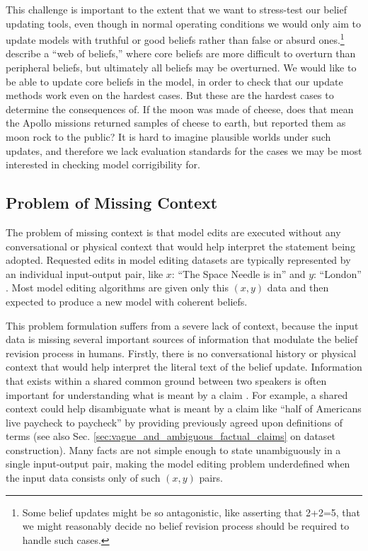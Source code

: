 \documentclass[11pt,a4paper]{article}
\begin{document}
This challenge is important to the extent that we want to stress-test our belief updating tools, even though in normal operating conditions we would only aim to update models with truthful or good beliefs rather than false or absurd ones.\footnote{Some belief updates might be so antagonistic, like asserting that 2+2=5, that we might reasonably decide no belief revision process should be required to handle such cases.} \citet{quine1970web} describe a ``web of beliefs,'' where core beliefs are more difficult to overturn than peripheral beliefs, but ultimately all beliefs may be overturned. 
We would like to be able to update core beliefs in the model, in order to check that our update methods work even on the hardest cases. But these are the hardest cases to determine the consequences of. If the moon was made of cheese, does that mean the Apollo missions returned samples of cheese to earth, but reported them as moon rock to the public? It is hard to imagine plausible worlds under such updates, and therefore we lack evaluation standards for the cases we may be most interested in checking model corrigibility for. 

\subsection{Problem of Missing Context}
\label{sec:problem_of_decontextualization}
The problem of missing context is that model edits are executed without any conversational or physical context that would help interpret the statement being adopted. Requested edits in model editing datasets are typically represented by an individual input-output pair, like $x$: ``The Space Needle is in'' and $y$: ``London'' \citep{zhu2020modifying, de2021editing, hase2021language, meng2022locating}. Most model editing algorithms are given only this $(x,y)$ data and then expected to produce a new model with coherent beliefs. 

This problem formulation suffers from a severe lack of context, because the input data is missing several important sources of information that modulate the belief revision process in humans. Firstly, there is no conversational history or physical context that would help interpret the literal text of the belief update. Information that exists within a shared common ground between two speakers is often important for understanding what is meant by a claim \citep{sep-speech-acts}. For example, a shared context could help disambiguate what is meant by a claim like ``half of Americans live paycheck to paycheck'' by providing previously agreed upon definitions of terms (see also Sec. \ref{sec:vague_and_ambiguous_factual_claims} on dataset construction). Many facts are not simple enough to state unambiguously in a single input-output pair, making the model editing problem underdefined when the input data consists only of such $(x,y)$ pairs.
\end{document}
